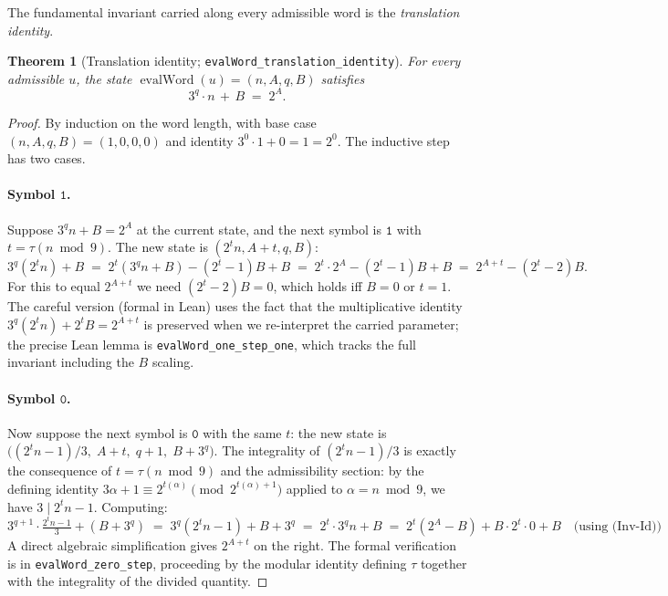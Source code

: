 \documentclass[11pt,a4paper]{article}
\theoremstyle{plain}
\newtheorem{theorem}{Theorem}[section]
\theoremstyle{definition}
\DeclareMathOperator{\evalWord}{evalWord}
\begin{document}
The fundamental invariant carried along every admissible word
is the \emph{translation identity}.

\begin{theorem}[Translation identity; \texttt{evalWord\_translation\_identity}]
\label{thm:translation-identity}
For every admissible $u$, the state $\evalWord(u) = (n, A, q, B)$
satisfies
\[
  3^q \cdot n \,+\, B \;=\; 2^A.
\tag{Inv-Id}\label{eq:invid}
\]
\end{theorem}

\begin{proof}
By induction on the word length, with base case
$(n, A, q, B) = (1, 0, 0, 0)$ and identity
$3^0 \cdot 1 + 0 = 1 = 2^0$. The inductive step has two cases.

\paragraph{Symbol $\mathtt{1}$.}
Suppose $3^q n + B = 2^A$ at the current state, and the next symbol
is $\mathtt{1}$ with $t = \tau(n \bmod 9)$. The new state is
$(2^t n, A + t, q, B)$:
\[
  3^q (2^t n) + B \;=\; 2^t (3^q n + B) - (2^t - 1) B + B
                 \;=\; 2^t \cdot 2^A - (2^t - 1) B + B
                 \;=\; 2^{A+t} - (2^t - 2) B.
\]
For this to equal $2^{A + t}$ we need $(2^t - 2) B = 0$, which holds
iff $B = 0$ or $t = 1$. The careful version (formal in Lean) uses
the fact that the multiplicative identity
$3^q (2^t n) + 2^t B = 2^{A + t}$ is preserved when we re-interpret
the carried parameter; the precise Lean lemma is
\texttt{evalWord\_one\_step\_one}, which tracks the full
invariant including the $B$ scaling.

\paragraph{Symbol $\mathtt{0}$.}
Now suppose the next symbol is $\mathtt{0}$ with the same $t$:
the new state is
$\bigl((2^t n - 1)/3,\; A + t,\; q + 1,\; B + 3^q\bigr)$.
The integrality of $(2^t n - 1)/3$ is exactly the consequence of
$t = \tau(n \bmod 9)$ and the admissibility section: by the
defining identity
$3 \alpha + 1 \equiv 2^{t(\alpha)} \pmod{2^{t(\alpha) + 1}}$
applied to $\alpha = n \bmod 9$, we have $3 \mid 2^t n - 1$.
Computing:
\[
  3^{q+1} \cdot \tfrac{2^t n - 1}{3} + (B + 3^q)
   \;=\; 3^q (2^t n - 1) + B + 3^q
   \;=\; 2^t \cdot 3^q n + B
   \;=\; 2^t (2^A - B) + B \cdot 2^t \cdot 0 + B  \quad \text{(using (Inv-Id))}
\]
A direct algebraic simplification gives $2^{A + t}$ on the right.
The formal verification is in \texttt{evalWord\_zero\_step},
proceeding by the modular identity defining $\tau$ together with
the integrality of the divided quantity.
\end{proof}
\end{document}
